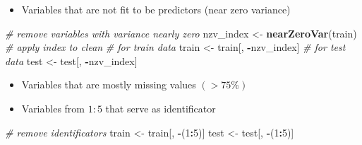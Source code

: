 \documentclass[
  10pt,
  a4paper]{article}
\newenvironment{Shaded}{\begin{snugshade}}{\end{snugshade}}
\newcommand{\CommentTok}[1]{\textcolor[rgb]{0.56,0.35,0.01}{\textit{#1}}}
\newcommand{\ControlFlowTok}[1]{\textcolor[rgb]{0.13,0.29,0.53}{\textbf{#1}}}
\newcommand{\DecValTok}[1]{\textcolor[rgb]{0.00,0.00,0.81}{#1}}
\newcommand{\FloatTok}[1]{\textcolor[rgb]{0.00,0.00,0.81}{#1}}
\newcommand{\KeywordTok}[1]{\textcolor[rgb]{0.13,0.29,0.53}{\textbf{#1}}}
\newcommand{\NormalTok}[1]{#1}
\newcommand{\OperatorTok}[1]{\textcolor[rgb]{0.81,0.36,0.00}{\textbf{#1}}}
\newcommand{\OtherTok}[1]{\textcolor[rgb]{0.56,0.35,0.01}{#1}}
\newcommand{\StringTok}[1]{\textcolor[rgb]{0.31,0.60,0.02}{#1}}
\providecommand{\tightlist}{%
  \setlength{\itemsep}{0pt}\setlength{\parskip}{0pt}}
\begin{document}
\begin{itemize}
\tightlist
\item
  Variables that are not fit to be predictors (near zero variance)
\end{itemize}

\begin{Shaded}
\begin{Highlighting}[]
\CommentTok{# remove variables with variance nearly zero}
\NormalTok{nzv_index <-}\StringTok{ }\KeywordTok{nearZeroVar}\NormalTok{(train)}
\CommentTok{# apply index to clean}
\CommentTok{# for train data}
\NormalTok{train <-}\StringTok{ }\NormalTok{train[, }\OperatorTok{-}\NormalTok{nzv_index]}
\CommentTok{# for test data}
\NormalTok{test  <-}\StringTok{ }\NormalTok{test[, }\OperatorTok{-}\NormalTok{nzv_index]}
\end{Highlighting}
\end{Shaded}

\begin{itemize}
\tightlist
\item
  Variables that are mostly missing values \(( > 75 \%)\)
\end{itemize}

\begin{Shaded}
\end{Shaded}

\begin{itemize}
\tightlist
\item
  Variables from \(1: 5\) that serve as identificator
\end{itemize}

\begin{Shaded}
\begin{Highlighting}[]
\CommentTok{# remove identificators}
\NormalTok{train <-}\StringTok{ }\NormalTok{train[, }\OperatorTok{-}\NormalTok{(}\DecValTok{1}\OperatorTok{:}\DecValTok{5}\NormalTok{)]}
\NormalTok{test  <-}\StringTok{ }\NormalTok{test[, }\OperatorTok{-}\NormalTok{(}\DecValTok{1}\OperatorTok{:}\DecValTok{5}\NormalTok{)]}
\end{Highlighting}
\end{Shaded}
\end{document}
